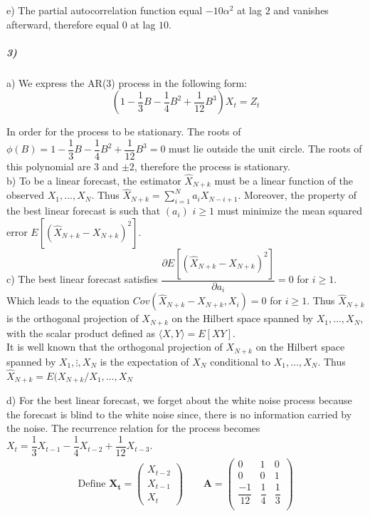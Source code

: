\documentclass{article}
\begin{document}
e) The partial autocorrelation function equal $-10\alpha^2$ at lag $2$ and vanishes afterward, therefore equal $0$ at lag $10$.

\subparagraph{3)}

a) We express the AR(3) process in the following form:
\[
(1-\dfrac{1}{3}B-\dfrac{1}{4} B^{2}+\dfrac{1}{12}B^3)X_{t}=Z_{t}
\]


In order for the process to be stationary. The roots of $\phi(B)=1-\dfrac{1}{3}B-\dfrac{1}{4} B^{2}+\dfrac{1}{12}B^3=0$
must lie outside the unit circle. The roots of this polynomial are $3$ and $\pm2$, therefore the process is stationary. \\

b) To be a linear forecast, the estimator $\widehat{X}_{N+k}$ must be a linear function of the observed $X_1, \hdots,X_N $. 
Thus $\displaystyle \widehat{X}_{N+k}=\sum_{i=1}^N a_i X_{N-i+1}$.
 Moreover, the property of the best linear forecast is such that $(a_i)$ $i\geq 1$ must minimize the mean squared error $E [ (\widehat{X}_{N+k}-X_{N+k})^2 ] $.\\
 
c) The best linear forecast satisfies $\dfrac{\partial E [ (\widehat{X}_{N+k}-X_{N+k})^2 ]}{\partial a_i}=0$ for $i\geq 1$. 
Which leads to the equation $Cov(\widehat{X}_{N+k}-X_{N+k},X_i)=0$ for $i\geq 1$. Thus $\widehat{X}_{N+k}$ is the orthogonal projection of $X_{N+k}$ on the Hilbert space spanned by $X_1, \hdots,X_N $, with the scalar product defined as $ \langle X,Y\rangle =E[XY]$.\\

It is well known that the orthogonal projection of ${X}_{N+k}$ on the Hilbert space spanned by $X_1, \vdots,X_N $ is the expectation of $X_N$ conditional to $X_1, \hdots,X_N $. 
Thus $\widehat{X}_{N+k}=E(X_{N+k} / X_1, \hdots,X_N$

d) For the best linear forecast, we forget about the white noise process because the forecast is blind to the white noise since, there is no information carried by the noise. The recurrence relation for the process becomes $X_t=\dfrac{1}{3}X_{t-1}-\dfrac{1}{4}X_{t-2}+\dfrac{1}{12}X_{t-3}$. 
\begin{align*}
\text{Define }
\pmb{X_{t}}=
\begin{pmatrix}
X_{t-2} \\
X_{t-1} \\
X_{t}
\end{pmatrix}
\qquad
\pmb{A}=
\begin{pmatrix}
0&1&0 \\
0&0&1 \\
\dfrac{-1}{12} & \dfrac{1}{4} & \dfrac{1}{3} \\
\end{pmatrix}
\end{align*}
\end{document}
